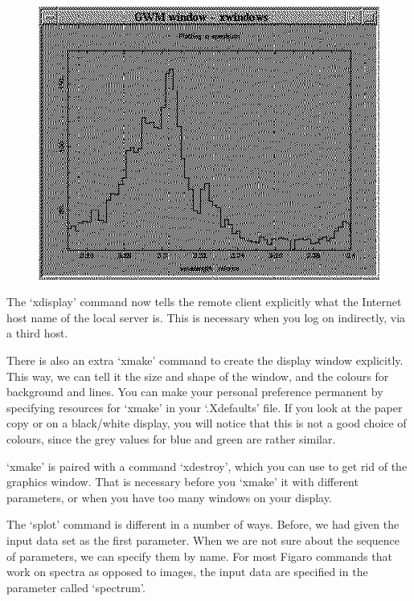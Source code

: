\begin{latexonly}
\begin{figure}[htb]
\begin{center}
\includegraphics{sun86_spec2.eps}
\end{center}
\end{figure}
\end{latexonly}

   The `xdisplay' command now tells the remote client explicitly what
   the Internet host name of the local server is. This is necessary when
   you log on indirectly, via a third host.

   There is also an extra `xmake' command to create the display window
   explicitly. This way, we can tell it the size and shape of the
   window, and the colours for background and lines. You can make your
   personal preference permanent by specifying resources for `xmake'
   in your `.Xdefaults' file. If you look at the paper copy or on a
   black/white display, you will notice that this is not a good choice
   of colours, since the grey values for blue and green are rather
   similar.

   `xmake' is paired with a command `xdestroy', which you can use to
   get rid of the graphics window. That is necessary before you
   `xmake' it with different parameters, or when you have too many
   windows on your display.

   The `splot' command is different in a number of ways. Before, we had
   given the input data set as the first parameter. When we are not sure
   about the sequence of parameters, we can specify them by name. For
   most Figaro commands that work on spectra as opposed to images, the
   input data are specified in the parameter called `spectrum'.

